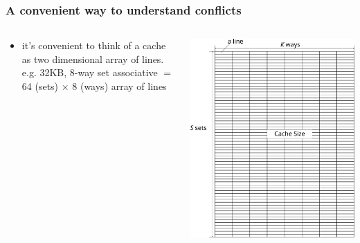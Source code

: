 \documentclass[12pt,dvipdfmx]{beamer}
\begin{document}
\begin{frame}
  \frametitle{A convenient way to understand conflicts}
\begin{columns}
  \begin{column}{0.6\textwidth}
    \begin{itemize}
    \item it's convenient to think of a cache as two dimensional array of lines. e.g.
      32KB, 8-way set associative $=$ 64 (sets) $\times$ 8 (ways) array of lines
    \end{itemize}
  \end{column}

  \begin{column}{0.4\textwidth}
    \begin{center}
      \includegraphics[width=1.0\textwidth]{out/pdf/svg/conflict_1.pdf}
    \end{center}
  \end{column}

\end{columns}
\end{frame}
\end{document}
